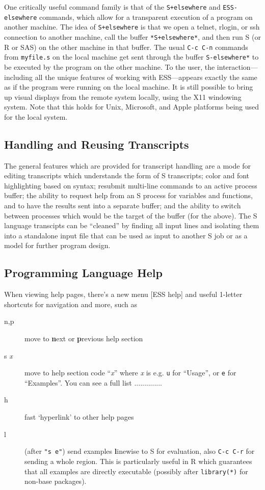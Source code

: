 \documentclass{article}
\begin{document}
One critically useful command family is that of the \verb|S+elsewhere|
and \verb|ESS-elsewhere| commands, which allow for a transparent execution
of a program on another machine.  The idea of 
\verb|S+elsewhere| is that we open a telnet, rlogin, or ssh connection to
another machine, call the buffer \verb|*S+elsewhere*|, and then run S (or R or SAS)
on the other machine in that buffer.
The usual {\tt C-c C-n} commands from {\tt myfile.s} on the local
machine get sent through the buffer {\tt *S-elsewhere*} to be executed
by the program on the other machine.  To the user, the interaction---including
all the unique features of working with ESS---appears exactly the same as if the
program were running on the local machine.
It is still possible to bring up
visual displays from the remote system locally, using the X11
windowing system.  Note that this holds for Unix, Microsoft, and Apple
platforms being used for the local system.

\subsection{Handling and Reusing Transcripts}
\label{sec:S:trans}

The general features which are provided for transcript handling are a
mode for editing transcripts which understands the form of S
transcripts; color and font highlighting based on syntax; resubmit
multi-line commands to an active process buffer; the ability to
request help from an S process for variables and functions, and to
have the results sent into a separate buffer; and the ability to
switch between processes which would be the target of the buffer (for
the above).  The S language transcipts can be ``cleaned'' by
finding all input lines and isolating them into a standalone input file
that can be used as input to another S job or as a model for further
program design.


\subsection{Programming Language Help}
\label{sec:S:help}
When viewing help pages, there's a new menu \textsf{[ESS help]} and
useful 1-letter shortcuts for navigation and more, such as
\begin{description}
\item[n,p] move to \textbf{n}ext or \textbf{p}revious help section
\item[s \textit{x}] move to help section code ``\textit{x}'' where
  \textit{x} is e.g. \texttt{u} for ``Usage'', or \texttt{e} for
  ``Examples''.  You can see a full list ..............
\item[h] fast `hyperlink' to other help pages
\item[l] (after \texttt{"s e"}) send examples \textbf{l}inewise to S for
  evaluation, also \texttt{C-c C-r} for sending a whole region.  This 
  is particularly useful in R which guarantees that all examples are
  directly executable (possibly after \texttt{library(*)} for non-base
  packages).
\end{description}
\end{document}
